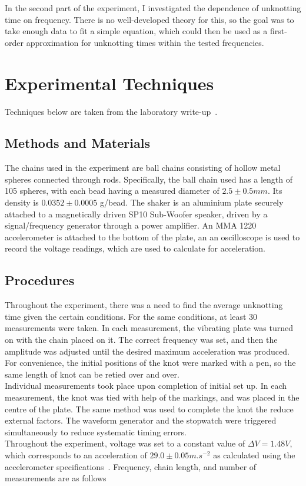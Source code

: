 \documentclass[12pt]{IEEEtran}
\begin{document}
In the second part of the experiment, I investigated the dependence of unknotting time on frequency. There is no well-developed theory for this, so the goal was to take enough data to fit a simple equation, which could then be used as a first-order approximation for unknotting times within the tested frequencies.

\section{Experimental Techniques}

Techniques below are taken from the laboratory write-up~\cite{manual}.

\subsection{Methods and Materials}

The chains used in the experiment are ball chains consisting of hollow metal spheres connected through rods. Specifically, the ball chain used has a length of 105 spheres, with each bead having a measured diameter of $2.5\pm0.5\unit{mm}$. Its density is $0.0352 \pm 0.0005$ g/bead. The shaker is an aluminium plate securely attached to a magnetically driven SP10 Sub-Woofer speaker, driven by a signal/frequency generator through a power amplifier. An MMA 1220 accelerometer is attached to the bottom of the plate, an an oscilloscope is used to record the voltage readings, which are used to calculate for acceleration.

\subsection{Procedures}

Throughout the experiment, there was a need to find the average unknotting time given the certain conditions. For the same conditions, at least 30 measurements were taken. In each measurement, the vibrating plate was turned on with the chain placed on it. The correct frequency was set, and then the amplitude was adjusted until the desired maximum acceleration was produced. For convenience, the initial positions of the knot were marked with a pen, so the same length of knot can be retied over and over. \\
Individual measurements took place upon completion of initial set up. In each measurement, the knot was tied with help of the markings, and was placed in the centre of the plate. The same method was used to complete the knot the reduce external factors. The waveform generator and the stopwatch were triggered simultaneously to reduce systematic timing errors. \\
Throughout the experiment, voltage was set to a constant value of $\Delta V = 1.48\unit{V}$, which corresponds to an acceleration of $29.0 \pm 0.05 \unit{m.s^{-2}}$ as calculated using the accelerometer specifications~\cite{accelerometer}. Frequency, chain length, and number of measurements are as follows
\end{document}

